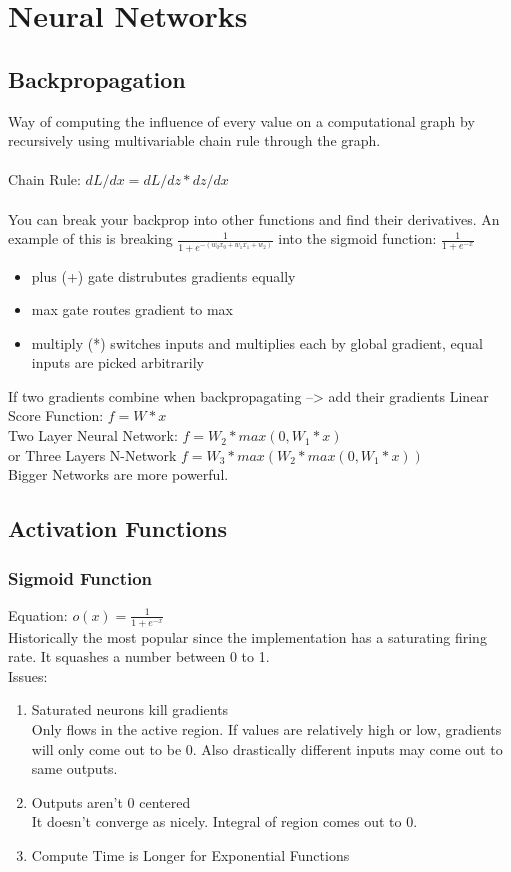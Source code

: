 \documentclass[11pt]{article}
\begin{document}
\section{Neural Networks}
\label{sec-2}
\subsection{Backpropagation}
\label{sec-2-1}
Way of computing the influence of every value on a computational graph by recursively using multivariable chain 
rule through the graph. \\ \\
Chain Rule: $dL/dx = dL/dz * dz/dx$ \\ \\
You can break your backprop into other functions and find their derivatives. An example of this is breaking 
$\frac{1}{1+e^{-(w_0x_0+w_1x_1+w_2)}}$ into the sigmoid function: $\frac{1}{1+e^{-x}}$
\begin{itemize}
\item plus (+) gate distrubutes gradients equally
\item max gate routes gradient to max
\item multiply (*) switches inputs and multiplies each by global gradient, equal inputs are picked arbitrarily
\end{itemize}
If two gradients combine when backpropagating --> add their gradients
Linear Score Function: $f = W*x$ \\
Two Layer Neural Network: $f = W_2 *max(0,W_1*x)$ \\ or Three Layers N-Network $f = W_3*max(W_2*max(0,W_1*x))$ \\
Bigger Networks are more powerful.\\
\subsection{Activation Functions}
\label{sec-2-2}
\subsubsection{Sigmoid Function}
\label{sec-2-2-1}
Equation: $o(x) = \frac{1}{1+e^{-x}}$ \\ Historically the most popular since the implementation has a saturating
firing rate. It squashes a number between 0 to 1.\\
Issues:
\begin{enumerate}
\item Saturated neurons kill gradients \\
\label{sec-2-2-1-1}
Only flows in the active region. If values are relatively high or low, gradients will only come out to be 0. Also drastically different inputs may come out to same outputs.
\item Outputs aren't 0 centered \\
\label{sec-2-2-1-2}
It doesn't converge as nicely. Integral of region comes out to 0.
\item Compute Time is Longer for Exponential Functions
\label{sec-2-2-1-3}
\end{enumerate}
\end{document}

